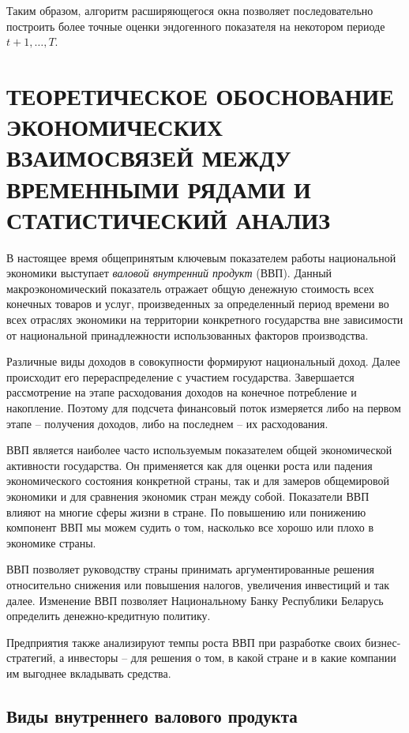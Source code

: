 \documentclass[a4paper, 14pt]{extreport}
\numberwithin{equation}{section}
\numberwithin{equation}{section}
\begin{document}
	Таким образом, алгоритм расширяющегося окна позволяет последовательно построить более точные оценки эндогенного показателя на некотором периоде $t+1,\ldots, T$.
	
	\newpage
	
	\chapter{ТЕОРЕТИЧЕСКОЕ ОБОСНОВАНИЕ ЭКОНОМИЧЕСКИХ ВЗАИМОСВЯЗЕЙ МЕЖДУ ВРЕМЕННЫМИ РЯДАМИ И СТАТИСТИЧЕСКИЙ АНАЛИЗ}
	\label{chapter:econom}
	
	В настоящее время общепринятым ключевым показателем
	работы национальной экономики выступает \textit{валовой внутренний продукт} (ВВП). Данный макроэкономический показатель отражает общую денежную стоимость всех конечных товаров и услуг, произведенных за определенный период времени во всех отраслях экономики на территории конкретного государства вне зависимости от национальной принадлежности использованных факторов производства.
	
	Различные виды доходов в совокупности формируют национальный доход.
	Далее происходит его перераспределение с участием государства. Завершается
	рассмотрение на этапе расходования доходов на конечное потребление и накопление.
	Поэтому для подсчета финансовый поток измеряется либо на первом этапе -- получения
	доходов, либо на последнем -- их расходования. 

	
	ВВП является наиболее часто используемым показателем общей экономической активности государства. Он применяется как для оценки роста или падения экономического состояния конкретной страны, так и для замеров общемировой экономики и для сравнения экономик стран между собой. Показатели ВВП влияют на многие сферы жизни в стране. По повышению или понижению компонент ВВП мы можем судить о том, насколько все хорошо или плохо в экономике страны.
	
	ВВП позволяет руководству страны принимать аргументированные решения относительно снижения или повышения налогов, увеличения инвестиций и так далее. Изменение ВВП позволяет Национальному Банку Республики Беларусь определить денежно-кредитную политику.
	
	Предприятия также анализируют темпы роста ВВП при разработке своих бизнес-стратегий, а инвесторы -- для решения о том, в какой стране и в какие компании им выгоднее вкладывать средства.
	
	\section{Виды внутреннего валового продукта}
	
\end{document}
